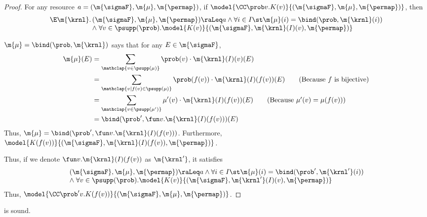 \begin{proof}
  For any resource $a = (\m{\sigmaF}, \m{\mu}, \m{\permap})$,
  if $ \model{\CC\prob v.K(v)}{(\m{\sigmaF}, \m{\mu}, \m{\permap})}$,
  then
  \begin{align*}
    \begin{array}[t]{@{}r@{\,}l@{}}
      \E \m{\krnl}.
      & (\m{\sigmaF}, \m{\mu}, \m{\permap}) \raLeq a
      \land
        \forall i\in I\st
        \m{\mu}(i) = \bind(\prob, \m{\krnl}(i))
      \\ & \land \;
        \forall v \in \psupp(\prob).
          \model{K(v)}{ (\m{\sigmaF}, \m{\krnl}(I)(v), \m{\permap}) }
    \end{array}
  \end{align*}

  $\m{\mu} = \bind(\prob, \m{\krnl})$  says that for any
  $E \in \m{\sigmaF}$,
  \begin{align}
    \m{\mu}(E)
    &= \sum_{\mathclap{v \in \psupp(\mu)}} \prob(v) \cdot \m{\krnl}(I)(v)(E) \notag \\
    &= \sum_{\mathclap{v \mid f(v) \in \psupp(\mu)}} \prob(f(v)) \cdot \m{\krnl}(I)(f(v))(E) \tag{Because $f$ is bijective}\\
    &= \sum_{\mathclap{v \in \psupp(\mu')}} \mu'(v) \cdot \m{\krnl}(I)(f(v))(E) \tag{Because $\mu'(v) = \mu(f(v))$} \\
    &= \bind(\prob', \fun v . \m{\krnl}(I)(f(v)))(E) \notag
  \end{align}
  Thus, $\m{\mu} = \bind(\prob', \fun v . \m{\krnl}(I)(f(v)))$.
  Furthermore, $\model{K(f(v))}{ (\m{\sigmaF}, \m{\krnl}(I)(f(v)), \m{\permap}) }$.

  Thus, if we denote $\fun v . \m{\krnl}(I)(f(v))$ as $\m{\krnl'}$, it satisfies
  \begin{align*}
    \begin{array}[t]{@{}r@{\,}l@{}}
      & (\m{\sigmaF}, \m{\mu}, \m{\permap}) \raLeq a
      \land
        \forall i\in I\st
        \m{\mu}(i) = \bind(\prob', \m{\krnl'}(i))
      \\ & \land \;
        \forall v \in \psupp(\prob).
          \model{K(v)}{ (\m{\sigmaF}, \m{\krnl'}(I)(v), \m{\permap})}
    \end{array}
  \end{align*}
  Thus, $ \model{\CC\prob' v.K(f(v))}{(\m{\sigmaF}, \m{\mu}, \m{\permap})}$.
\end{proof}
 \begin{lemma}
\label{proof:sure-str-convex}
   is sound.
\end{lemma}

